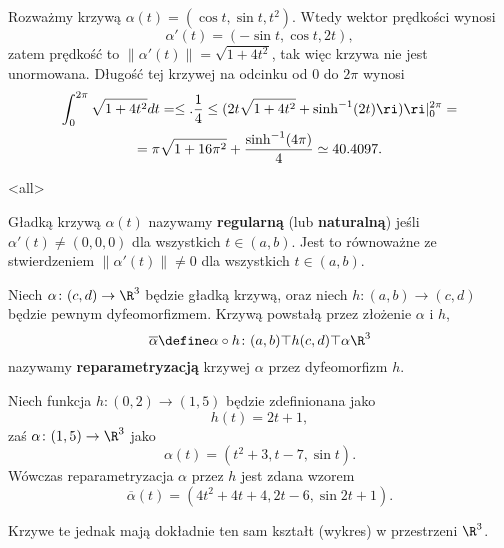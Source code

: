 \begin{frame}[<+->]

\begin{przyklad}
Rozważmy krzywą $\alpha(t)=(\cos{t},\sin{t},t^2)$. Wtedy wektor prędkości wynosi 
\[\alpha'(t)=(-\sin{t},\cos{t},2t),\]
zatem prędkość to 
$\|\alpha'(t)\|=\sqrt{1+4t^2}$, tak więc krzywa nie jest unormowana. 
Długość tej krzywej na odcinku od $0$ do $2\pi$ wynosi
\begin{multline*}
\int_{0}^{2\pi}\sqrt{1+4t^2} dt=\le.\frac{1}{4}\le( 2 t \sqrt{1+4 t^{2}} 
+\sinh^{-1}(2t)\ri)\ri|_{0}^{2\pi}=\\
=\pi \sqrt{1+16 \pi^2}+\frac{\sinh^{-1}(4 \pi)}{4}\simeq 40.4097.
\end{multline*}
\end{przyklad}

\end{frame}
\mode<all>{}
\begin{frame}[<+->]
\begin{definicja}
Gładką krzywą $\alpha(t)$ nazywamy \textbf{regularną} (lub \textbf{naturalną}) 
jeśli $\alpha'(t)\neq (0,0,0)$ dla wszystkich $t\in (a,b)$. Jest to równoważne 
ze stwierdzeniem $\|\alpha'(t)\|\neq 0$ dla wszystkich $t\in (a,b)$.
\end{definicja}

\begin{definicja}
Niech $\alpha\colon (c,d)\to \R^3$ będzie gładką krzywą, oraz niech 
$h\colon (a,b)\to (c,d)$ będzie pewnym dyfeomorfizmem. Krzywą powstałą przez 
złożenie $\alpha$ i $h$,\[\overline{\alpha}\define \alpha\circ h\colon 
(a,b)\top{h}(c,d)\top{\alpha}\R^3\]
nazywamy \textbf{reparametryzacją} krzywej $\alpha$ przez dyfeomorfizm $h$.


\end{definicja}
\end{frame}

\begin{frame}


\begin{przyklad}
Niech funkcja $h\colon (0,2)\to (1,5)$ będzie zdefinionana jako \[h(t)=2t+1,\] 
zaś $\alpha\colon (1,5)\to\R^3$ jako \[\alpha(t)=(t^2+3,t-7,\sin{t}).\] 
\pause Wówczas reparametryzacja $\alpha$ przez $h$ jest zdana wzorem
\[\overline{\alpha}(t)=(4t^2+4t+4,2t-6,\sin2t+1).\]

\pause Krzywe te jednak mają dokładnie ten sam kształt (wykres) w przestrzeni 
$\R^3$.
\end{przyklad}

\end{frame}

